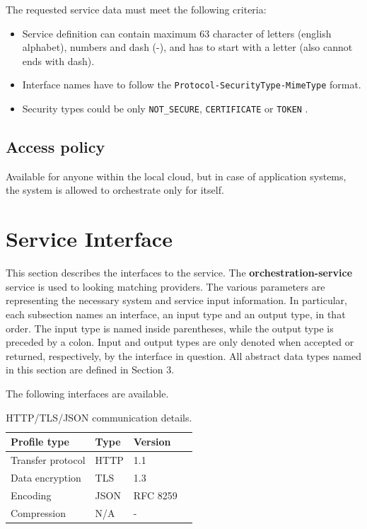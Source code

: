 \documentclass[a4paper]{arrowhead}
\begin{document}
The requested service data must meet the following criteria:

\begin{itemize}
    \item Service definition can contain maximum 63 character of letters (english alphabet), numbers and dash (-), and has to start with a letter (also cannot ends with dash).
    \item Interface names have to follow the \texttt{Protocol-SecurityType-MimeType} format.
    \item Security types could be only \texttt{NOT\_SECURE}, \texttt{CERTIFICATE} or \texttt{TOKEN} .
\end{itemize}

\subsection{Access policy}
\label{sec:accesspolicy}

Available for anyone within the local cloud, but in case of application systems, the system is allowed to orchestrate only for itself. 

\newpage

\section{Service Interface}
\label{sec:functions}

This section describes the interfaces to the service. The \textbf{orchestration-service} service is used to looking matching providers. The various parameters are representing the necessary system and service input information.
In particular, each subsection names an interface, an input type and an output type, in that order.
The input type is named inside parentheses, while the output type is preceded by a colon.
Input and output types are only denoted when accepted or returned, respectively, by the interface in question. All abstract data types named in this section are defined in Section 3.

The following interfaces are available.


\begin{table}[ht!]
  \centering
  \begin{tabular}{|l|l|l|l|}
    \rowcolor{gray!33} Profile type & Type & Version \\ \hline
    Transfer protocol & HTTP & 1.1 \\ \hline
    Data encryption & TLS & 1.3 \\ \hline
    Encoding & JSON & RFC 8259 \cite{rfc8259} \\ \hline
    Compression & N/A & - \\ \hline
  \end{tabular}
  \caption{HTTP/TLS/JSON communication details.}
  \label{tab:comunication_semantics_profile}
\end{table}
\end{document}
